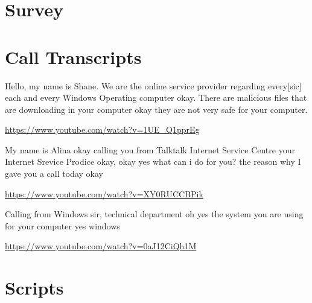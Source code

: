 \documentclass[main.tex]{subfiles}
\begin{document}
\section{Survey}
\section{Call Transcripts}
Hello, my name is Shane. We are the online service provider regarding every[sic] each and every Windows Operating computer okay. There are malicious files that are downloading in your computer okay they are not very safe for your computer.

\url{https://www.youtube.com/watch?v=1UE_Q1pprEg}

My name is Alina okay calling you from Talktalk Internet Service Centre your Internet Srevice Prodice okay,
okay yes what can i do for you?
 the reason why I gave you a call today okay


\url{https://www.youtube.com/watch?v=XY0RUCCBPik}

Calling from Windows sir, technical department
oh yes
the system you are using for your computer
yes windows

\url{https://www.youtube.com/watch?v=0aJ12CiQh1M}




\section{Scripts}
\end{document}
